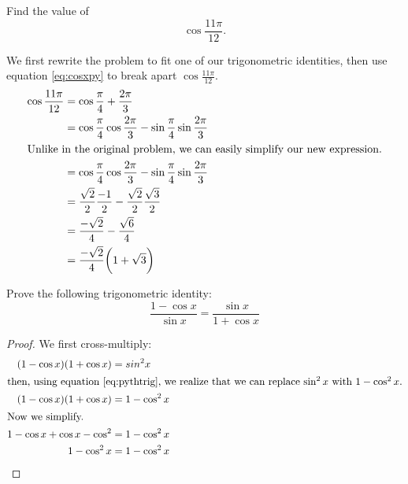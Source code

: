 \begin{ex}
  Find the value of
  \[ \cos{\frac{11 \pi}{12}} \text{.}\]
  \begin{sol}
    We first rewrite the problem to fit one of our trigonometric identities,
    then use equation \eqref{eq:cosxpy} to break apart \(\cos{\frac{11 \pi}{12}}\).
    \begin{align*}
      \cos{\frac{11 \pi}{12}}
      &=\cos{\frac{\pi}{4}+\frac{2 \pi}{3}}\\
      &=\cos{\frac{\pi}{4}} \cos{\frac{2\pi}{3}}
        -\sin\frac{\pi}{4} \sin\frac{2\pi}{3} \\
      \intertext{Unlike in the original problem, we can easily simplify our new expression.}
      &=\cos{\frac{\pi}{4}} \cos{\frac{2\pi}{3}}
        - \sin{\frac{\pi}{4}} \sin{\frac{2\pi}{3}}\\
      &= \frac{\sqrt 2}{2} \frac{-1}{2}
        -\frac{\sqrt 2}{2} \frac{\sqrt 3}{2}\\
      &=\frac{-\sqrt 2}{4}
        - \frac{\sqrt{6}}{4} \\
      &= \frac{-\sqrt 2}{4}\bigg(1+\sqrt 3\bigg)
    \end{align*}
  \end{sol}
\end{ex}
\begin{ex}
  Prove the following trigonometric identity:
  \[ \frac{1-\cos x}{\sin x}=\frac{\sin x}{1+\cos x} \]
  \begin{proof}
    We first cross-multiply:
    \begin{align*}
      \ (1-\cos x)(1+\cos x) &= sin^2 x \\
      \intertext{then, using equation \eqref{eq:pythtrig}, we realize that we can replace \(\sin^2 x\) with \(1-\cos^2 x\).}
       (1-\cos x)(1+\cos x) &= 1-\cos^2x\\
      \intertext{Now we simplify.}
      1-\cos x + \cos x -\cos^2 &= 1-\cos^2x \\
      1-\cos^2x &= 1-\cos^2x \qedhere
    \end{align*}
  \end{proof}
\end{ex}
